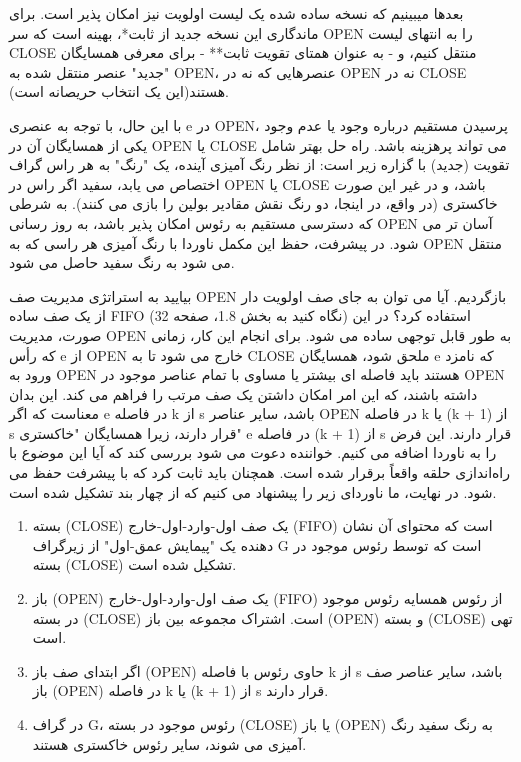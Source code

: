 \documentclass{book} %
\begin{document}
بعدها میبینیم که نسخه ساده شده یک لیست اولویت نیز امکان پذیر است. برای ماندگاری این نسخه جدید از ثابت*، بهینه است که سر OPEN را به انتهای لیست CLOSE منتقل کنیم، و - به عنوان همتای تقویت ثابت** - برای معرفی همسایگان "جدید" عنصر منتقل شده به OPEN، عنصرهایی که نه در OPEN نه در CLOSE هستند(این یک انتخاب حریصانه است).

با این حال، با توجه به عنصری e در OPEN، پرسیدن مستقیم درباره وجود یا عدم وجود یکی از همسایگان آن در OPEN یا CLOSE می تواند پرهزینه باشد. راه حل بهتر شامل تقویت (جدید) با گزاره زیر است: از نظر رنگ آمیزی آینده، یک "رنگ" به هر راس گراف اختصاص می یابد، سفید اگر راس در OPEN یا CLOSE باشد، و در غیر این صورت خاکستری (در واقع، در اینجا، دو رنگ نقش مقادیر بولین را بازی می کنند). به شرطی که دسترسی مستقیم به رئوس امکان پذیر باشد، به روز رسانی OPEN آسان تر می شود. در پیشرفت، حفظ این مکمل ناوردا با رنگ آمیزی هر راسی که به OPEN منتقل می شود به رنگ سفید حاصل می شود.

بیایید به استراتژی مدیریت صف OPEN بازگردیم. آیا می توان به جای صف اولویت دار از یک صف ساده FIFO (نگاه کنید به بخش 1.8، صفحه 32) استفاده کرد؟ در این صورت، مدیریت OPEN به طور قابل توجهی ساده می شود. برای انجام این کار، زمانی که رأس e از OPEN خارج می شود تا به CLOSE ملحق شود، همسایگان e که نامزد ورود به OPEN هستند باید فاصله ای بیشتر یا مساوی با تمام عناصر موجود در OPEN داشته باشند، که این امر امکان داشتن یک صف مرتب را فراهم می کند. این بدان معناست که اگر e در فاصله k از s باشد، سایر عناصر OPEN در فاصله k یا (k + 1) از s قرار دارند، زیرا همسایگان "خاکستری" e در فاصله (k + 1) از s قرار دارند. این فرض را به ناوردا اضافه می کنیم. خواننده دعوت می شود بررسی کند که آیا این موضوع با راه‌اندازی حلقه واقعاً برقرار شده است. همچنان باید ثابت کرد که با پیشرفت حفظ می شود. در نهایت، ما ناوردای زیر را پیشنهاد می کنیم که از چهار بند تشکیل شده است.

\begin{enumerate}
    \item  بسته (CLOSE) یک صف اول-وارد-اول-خارج (FIFO) است که محتوای آن نشان دهنده یک "پیمایش عمق-اول" از زیرگراف G است که توسط رئوس موجود در بسته (CLOSE) تشکیل شده است.
    
    \item  باز (OPEN) یک صف اول-وارد-اول-خارج (FIFO) از رئوس همسایه رئوس موجود در بسته (CLOSE) است. اشتراک مجموعه بین باز (OPEN) و بسته (CLOSE) تهی است.

    \item اگر ابتدای صف باز (OPEN) حاوی رئوس با فاصله k از s باشد، سایر عناصر صف باز (OPEN) در فاصله k یا (k + 1) از s قرار دارند.

    \item در گراف G، رئوس موجود در بسته (CLOSE) یا باز (OPEN) به رنگ سفید رنگ آمیزی می شوند، سایر رئوس خاکستری هستند.
\end{enumerate}
\newpage
\end{document}
